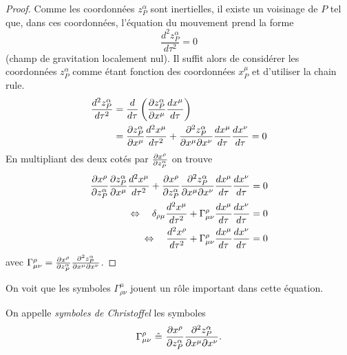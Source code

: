 \documentclass[a4paper,11pt]{report}
\begin{document}
            \begin{proof}
                Comme les coordonnées $z^\alpha_P$ sont inertielles, il existe un voisinage de $P$ tel que, dans ces coordonnées, l'équation du mouvement prend la forme
                \begin{equation}
                    \frac{d^2 z^\alpha_P}{d\tau^2} = 0
                \end{equation}
                (champ de gravitation localement nul). Il suffit alors de considérer les coordonnées $z^\alpha_P$ comme étant fonction des coordonnées $x^\mu_P$ et d'utiliser la chain rule.
                \begin{align}
                    \frac{d^2 z^\alpha_P}{d\tau^2} &= \frac{d}{d\tau}\left( \frac{\partial z^\alpha_P}{\partial x^\mu}\frac{dx^\mu}{d\tau} \right) \\
                    &= \frac{\partial z^\alpha_P}{\partial x^\mu}\frac{d^2x^\mu}{d\tau^2}+\frac{\partial^2 z^\alpha_P}{\partial x^\mu\partial x^\nu}\frac{dx^\mu}{d\tau}\frac{dx^\nu}{d\tau} = 0
                \end{align}
                En multipliant des deux cotés par $\frac{\partial x^\rho}{\partial z^\alpha_P}$ on trouve
                \begin{align}
                    \frac{\partial x^\rho}{\partial z^\alpha_P}\frac{\partial z^\alpha_P}{\partial x^\mu}\frac{d^2x^\mu}{d\tau^2}+\frac{\partial x^\rho}{\partial z^\alpha_P}\frac{\partial^2 z^\alpha_P}{\partial x^\mu\partial x^\nu}\frac{dx^\mu}{d\tau}\frac{dx^\nu}{d\tau} &= 0 \\
                    \Leftrightarrow\quad \delta_{\rho\mu}\frac{d^2x^\mu}{d\tau^2}+\Gamma^\rho_{\mu\nu}\frac{dx^\mu}{d\tau}\frac{dx^\nu}{d\tau} &= 0 \\
                    \Leftrightarrow\quad \frac{d^2x^\rho}{d\tau^2}+\Gamma^\rho_{\mu\nu}\frac{dx^\mu}{d\tau}\frac{dx^\nu}{d\tau} &= 0 
                \end{align}
                avec $\Gamma^\rho_{\mu\nu} = \frac{\partial x^\rho}{\partial z^\alpha_P}\frac{\partial^2 z^\alpha_P}{\partial x^\mu\partial x^\nu}$.
            \end{proof}
            
            On voit que les symboles $\Gamma^\mu_{\rho\nu}$ jouent un rôle important dans cette équation.
            
            \begin{definition}
                On appelle \textit{symboles de Christoffel} les symboles
                \begin{equation}
                    \Gamma^\rho_{\mu\nu} ~\hat{=}~ \frac{\partial x^\rho}{\partial z^\alpha_P}\frac{\partial^2 z^\alpha_P}{\partial x^\mu\partial x^\nu}.
                \end{equation}
            \end{definition}
            
\end{document}
